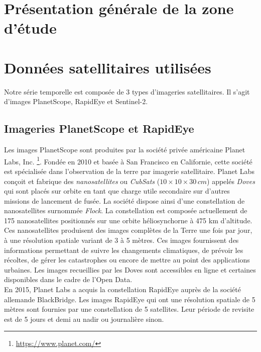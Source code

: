 \section{Présentation générale de la zone d'étude}

\section{Données satellitaires utilisées}

Notre série temporelle est composée de 3 types d’imageries satellitaires. Il s'agit d'images PlanetScope, RapidEye et Sentinel-2. 

  \subsection{Imageries PlanetScope et RapidEye}
  
Les images PlanetScope sont produites par la société privée américaine Planet Labs, Inc. \footnote{\url{https://www.planet.com/}}. Fondée en 2010 et basée à San Francisco 
en Californie, cette société est spécialisée dans l'observation de la terre par imagerie satellitaire. Planet Labs conçoit et fabrique des \emph{nanosatellites} ou \emph{CubSats} 
($10\times10\times30\,cm$) appelés \emph{Doves} qui sont placés sur orbite en tant que charge utile secondaire sur d'autres missions de lancement de fusée. La société dispose ainsi d'une
constellation de nanosatellites surnommée \emph{Flock}. La constellation est composée actuellement de 175 nanosatellites positionnés sur une orbite héliosynchorne à 475 km 
d’altitude. Ces nanosatellites produisent des images complètes de la Terre une fois par jour, à une résolution 
spatiale variant de 3 à 5 mètres. Ces images fournissent des informations permettant de suivre les changements climatiques, de prévoir les récoltes, de gérer les catastrophes ou encore de 
mettre au point des applications urbaines. Les images recueillies par les Doves sont accessibles en ligne et certaines disponibles dans le cadre de l'Open Data. \\
En 2015, Planet Labs a acquis la constellation RapidEye auprès de la société allemande BlackBridge. Les images RapidEye qui ont une résolution spatiale de 5 mètres sont fournies par une 
constellation de 5 satellites. Leur période de revisite est de 5 jours et demi au nadir ou journalière sinon. 

